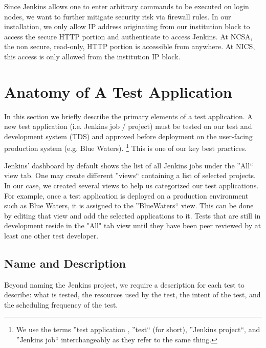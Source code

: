 \documentclass[10pt, conference, compsocconf]{IEEEtran}
\begin{document}
Since Jenkins allows one to enter arbitrary commands to be executed on login nodes, we want to further mitigate security risk via firewall rules. 
In our installation, we only allow IP address originating from our institution block to access the secure HTTP portion and authenticate to access Jenkins. 
At NCSA, the non secure, read-only, HTTP portion is accessible from anywhere. 
At NICS, this access is only allowed from the institution IP block. 


\section{Anatomy of A Test Application}
\label{sec:TestAnatomy}
In this section we briefly describe the primary elements of a test application. 
A new test application (i.e. Jenkins job / project) must be tested on our test and development system (TDS) and approved before deployment on the user-facing production system (e.g. Blue Waters). 
\footnote{We use the terms ''test application , ''test`` (for short), ''Jenkins project``, and ''Jenkins job`` interchangeably as they refer to the same thing.}
This is one of our key best practices. 

Jenkins' dashboard by default shows the list of all Jenkins jobs under the ''All`` view tab. 
One may create different ''views`` containing a list of selected projects. 
In our case, we created several views to help us categorized our test applications.
For example, once a test application is deployed on a production environment such as Blue Waters, it is assigned to the ''BlueWaters`` view. 
This can be done by editing that view and add the selected applications to it.
Tests that are still in development reside in the "All" tab view until they have been peer reviewed by at least one other test developer.

\subsection{Name and Description}
Beyond naming the Jenkins project, we require a description for each test to describe: what is tested, the resources used by the test, the intent of the test, and the scheduling frequency of the test.
\end{document}
